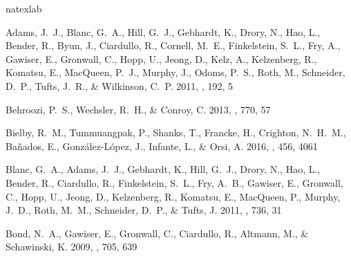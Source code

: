 \documentclass{emulateapj}
\providecommand{\DIFaddbegin}{} %
\providecommand{\DIFaddend}{} %
\providecommand{\DIFdelbegin}{} %
\providecommand{\DIFdelend}{} %
\begin{document}

%
\DIFdelbegin %
\DIFdelend \DIFaddbegin \begin{thebibliography}{43}
\DIFaddend \expandafter\ifx\csname natexlab\endcsname\relax\def\natexlab#1{#1}\fi

{Adams}, J.~J., {Blanc}, G.~A., {Hill}, G.~J., {Gebhardt}, K., {Drory}, N.,
  {Hao}, L., {Bender}, R., {Byun}, J., {Ciardullo}, R., {Cornell}, M.~E.,
  {Finkelstein}, S.~L., {Fry}, A., {Gawiser}, E., {Gronwall}, C., {Hopp}, U.,
  {Jeong}, D., {Kelz}, A., {Kelzenberg}, R., {Komatsu}, E., {MacQueen}, P.~J.,
  {Murphy}, J., {Odoms}, P.~S., {Roth}, M., {Schneider}, D.~P., {Tufts}, J.~R.,
  \& {Wilkinson}, C.~P. 2011, \apjs, 192, 5

{Behroozi}, P.~S., {Wechsler}, R.~H., \& {Conroy}, C. 2013, \apj, 770, 57

{Bielby}, R.~M., {Tummuangpak}, P., {Shanks}, T., {Francke}, H., {Crighton},
  N.~H.~M., {Ba{\~n}ados}, E., {Gonz{\'a}lez-L{\'o}pez}, J., {Infante}, L., \&
  {Orsi}, A. 2016, \mnras, 456, 4061

{Blanc}, G.~A., {Adams}, J.~J., {Gebhardt}, K., {Hill}, G.~J., {Drory}, N.,
  {Hao}, L., {Bender}, R., {Ciardullo}, R., {Finkelstein}, S.~L., {Fry}, A.~B.,
  {Gawiser}, E., {Gronwall}, C., {Hopp}, U., {Jeong}, D., {Kelzenberg}, R.,
  {Komatsu}, E., {MacQueen}, P., {Murphy}, J.~D., {Roth}, M.~M., {Schneider},
  D.~P., \& {Tufts}, J. 2011, \apj, 736, 31

{Bond}, N.~A., {Gawiser}, E., {Gronwall}, C., {Ciardullo}, R., {Altmann}, M.,
  \& {Schawinski}, K. 2009, \apj, 705, 639


\end{thebibliography}
\end{document}
